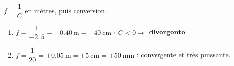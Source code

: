 \documentclass[11pt,a4paper]{article}
\begin{document}
\begin{corrige}
$f=\dfrac{1}{C}$ en mètres, puis conversion.
\begin{enumerate}[label=\alph*)]
  \item $f=\dfrac{1}{-2,5}=-\qty{0.40}{\m}=-\qty{40}{\cm}$ : $C<0\Rightarrow$ \textbf{divergente}.
  \item $f=\dfrac{1}{20}=+\qty{0.05}{\m}=+\qty{5}{\cm}=+\qty{50}{\mm}$ : convergente et très puissante.
\end{enumerate}
\end{corrige}
\end{document}

